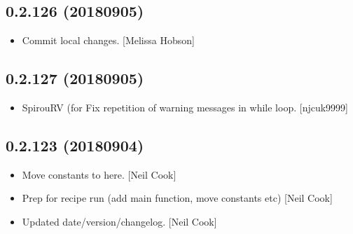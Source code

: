 \documentclass[a4paper,10pt,english]{report}
\begin{document}
\subsection{0.2.126 (2018\sphinxhyphen{}09\sphinxhyphen{}05)}
\label{\detokenize{misc/changelog:id356}}\begin{itemize}
\item {} 
Commit local changes. {[}Melissa Hobson{]}

\end{itemize}


\subsection{0.2.127 (2018\sphinxhyphen{}09\sphinxhyphen{}05)}
\label{\detokenize{misc/changelog:id357}}\begin{itemize}
\item {} 
SpirouRV (for  \sphinxhyphen{} Fix repetition of warning
messages in while loop. {[}njcuk9999{]}

\end{itemize}


\subsection{0.2.123 (2018\sphinxhyphen{}09\sphinxhyphen{}04)}
\label{\detokenize{misc/changelog:id358}}\begin{itemize}
\item {} 
Move  constants to here. {[}Neil Cook{]}

\item {} 
Prep  for recipe run (add main function, move constants
etc) {[}Neil Cook{]}

\item {} 
Updated date/version/changelog. {[}Neil Cook{]}

\end{itemize}
\end{document}
